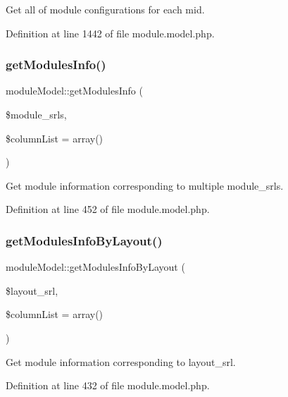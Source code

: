 Get all of module configurations for each mid. 



Definition at line 1442 of file module.\+model.\+php.

\hypertarget{classmoduleModel_afc4f6749feac12e176959c170ee25012}{}\label{classmoduleModel_afc4f6749feac12e176959c170ee25012} 
\subsubsection{\texorpdfstring{get\+Modules\+Info()}{getModulesInfo()}}
{\footnotesize\ttfamily module\+Model\+::get\+Modules\+Info (\begin{DoxyParamCaption}\item[{}]{\$module\+\_\+srls,  }\item[{}]{\$column\+List = {\ttfamily array()} }\end{DoxyParamCaption})}



Get module information corresponding to multiple module\+\_\+srls. 



Definition at line 452 of file module.\+model.\+php.

\hypertarget{classmoduleModel_a512433daf11267d2bcfafed99caea883}{}\label{classmoduleModel_a512433daf11267d2bcfafed99caea883} 
\subsubsection{\texorpdfstring{get\+Modules\+Info\+By\+Layout()}{getModulesInfoByLayout()}}
{\footnotesize\ttfamily module\+Model\+::get\+Modules\+Info\+By\+Layout (\begin{DoxyParamCaption}\item[{}]{\$layout\+\_\+srl,  }\item[{}]{\$column\+List = {\ttfamily array()} }\end{DoxyParamCaption})}



Get module information corresponding to layout\+\_\+srl. 



Definition at line 432 of file module.\+model.\+php.

